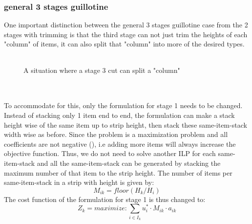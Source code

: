 \documentclass[a4paper]{article}
\begin{document}
    \subsubsection{general 3 stages guillotine}
    One important distinction between the general 3 stages guillotine case from the 2 stages with trimming is that the third stage can not just trim the heights of each "column" of items, it can also split that "column" into more of the desired types.
    \\ \\
    \begin{figure}[h]
        \centering
        \caption{A situation where a stage 3 cut can split a "column"}
    \end{figure}
    \\ \\
    \noindent
    To accommodate for this, only the formulation for stage 1 needs to be changed. Instead of stacking only 1 item end to end, the formulation can make a stack height wise of the same item up to strip height, then stack these same-item-stack width wise as before. Since the problem is a maximization problem and all coefficients are not negative (), i.e adding more items will always increase the objective function. Thus, we do not need to solve another ILP for each same-item-stack and all the same-item-stack can be generated by stacking the maximum number of that item to the strip height. The number of items  per same-item-stack in a strip  with height  is given by:
    \[ M_{ik} = floor( H_k / H_i ) \]
    The cost function of the formulation for stage 1 is thus changed to:
    \[ Z_k = maximize: \sum_{i \in I_k} u_i^* \cdot M_{ik} \cdot a_{ik}  \]
    
\end{document}
